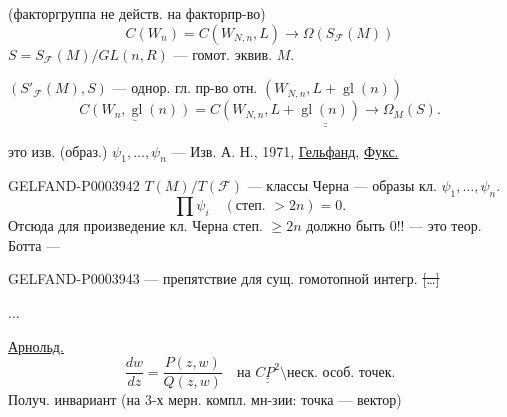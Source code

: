 (факторгруппа не действ. на факторпр-во)
\begin{equation*}
C(W_n)=C(W_{N,n},L)\longrightarrow\Omega(S_{\mathcal{F}}(M))
\end{equation*}
$S=S_{\mathcal{F}}(M)/GL(n,R)$ --- гомот. эквив. $M$.

$(S'_{\mathcal{F}}(M),S)$ --- однор. гл. пр-во отн.
$(W_{N,n},L+\operatorname{gl}(n))$
\begin{equation*}
\underline{C(W_n,\operatorname{gl}(n))}
=\underline{\underline{C(W_{N,n},L+\operatorname{gl}(n))\longrightarrow\Omega_M(S).}}
\end{equation*}

это изв. (образ.) $\psi_1,\dots,\psi_n$ ---
Изв. А. Н., 1971, \underline{Гельфанд,} \underline{Фукс.}

\begin{GelfandAdjacentEvidence}{GELFAND-P000394}{2}
$T(M)/T(\mathcal{F})$ --- классы Черна --- образы кл. $\psi_1,\dots,\psi_n$.
\begin{equation*}
\prod\psi_i\quad(\text{степ. }>2n)=0.
\end{equation*}
Отсюда для
произведение кл. Черна
степ. $\geq2n$ должно быть $0$!! --- это теор. Ботта ---
\end{GelfandAdjacentEvidence}


\begin{GelfandAdjacentEvidence}{GELFAND-P000394}{3}
--- препятствие для сущ. гомотопной интегр. \sout{[\dots]}
\end{GelfandAdjacentEvidence}

$\dots$

\begin{center}\end{center}
\underline{Арнольд.}
\begin{equation*}
\frac{dw}{dz}=\frac{P(z,w)}{Q(z,w)}
\quad\text{на }\underline{\underline{CP^2}}\setminus\text{неск. особ. точек.}
\end{equation*}
Получ. инвариант  (на 3-х мерн. компл.
мн-зии: точка --- вектор)


